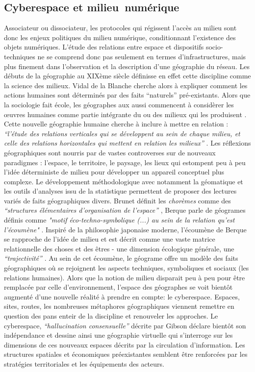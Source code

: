 \subsection[Cyberespace et milieu numérique]{Cyberespace et milieu numérique}
Associateur ou dissociateur, les protocoles qui régissent l’accès au milieu sont donc les enjeux politiques du milieu numérique, conditionnant l’existence des objets numériques. L’étude des relations entre espace et dispositifs socio-techniques ne se comprend donc pas seulement en termes d’infrastructures, mais plus finement dans l’observation et la description d’une géographie du réseau. Les débuts de la géographie au XIXème siècle définisse en effet cette discipline comme la science des milieux. Vidal de la Blanche cherche alors à expliquer comment les actions humaines sont déterminés par des faits “naturels” pré-existants. Alors que la sociologie fait école, les géographes aux aussi commencent à considèrer les œuvres humaines comme partie intégrante du ou des milieux qui les produisent \citep{Demangeon1942}. Cette nouvelle géographie humaine cherche à inclure à mettre en relation : \textit{“l'étude des relations verticales qui se développent au sein de chaque milieu, et celle des relations horizontales qui mettent en relation les milieux”} \citep{Claval1990}. Les réflexions géographiques sont nourris par de vastes controverses sur de nouveaux paradigmes : l'espace, le territoire, le paysage, les lieux qui estompent peu à peu l’idée déterministe de milieu pour développer un appareil conceptuel plus complexe. Le développement méthodologique avec notamment la géomatique et les outils d’analyses issu de la statistique permettent de proposer des lectures variés de faits géographiques divers. Brunet définit les \textit{chorèmes} comme des \textit{“structures élémentaires d'organisation de l'espace”} \citep{Brunet1980}, Berque parle de géogrames définis comme \textit{"motif éco-techno-symbolique (...) au sein de la relation qu'est l'écoumène"} \citep{Berque1999}. Inspiré de la philosophie japonaise moderne, l’écoumène de Berque se rapproche de l’idée de milieu et est décrit comme une vaste matrice relationnelle des choses et des êtres - une dimension écologique générale, une \textit{“trajectivité”} \citep{Watsuji2011}. Au sein de cet écoumène, le géograme offre un modèle des faits géographiques où se rejoignent les aspects techniques, symboliques et sociaux (les relations humaines). Alors que la notion de milieu disparait peu à peu pour être remplacée par celle d’environnement\citep{dAngio2001}, l’espace des géographes se voit bientôt augmenté d’une nouvelle réalité à prendre en compte: le cyberespace. Espaces, sites, routes, les nombreuses métaphores géographiques viennent remettre en question des pans enteir de la discipline et renouveler les approches. Le cyberespace, \textit{“hallucination consensuelle”} décrite par Gibson \citep{Gibson1984} déclare bientôt son indépendance \citep{Barlow1990} et dessine ainsi une géographie virtuelle \citep{Batty1997} qui s’interroge sur les dimensions de ces nouveaux espaces décrits par la circulation d’information. Les structures spatiales et économiques préexistantes semblent être renforcées par les stratégies territoriales et les équipements des acteurs. 